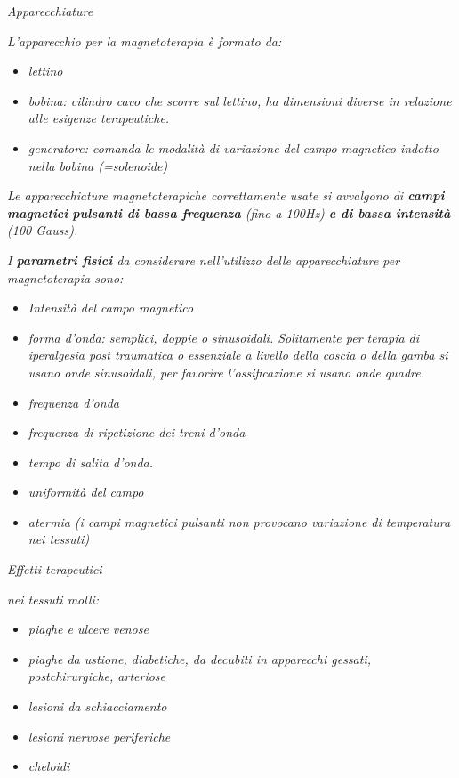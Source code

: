 \documentclass[]{article}
\begin{document}
\emph{Apparecchiature}

\emph{L'apparecchio per la magnetoterapia è formato da:}

\begin{itemize}
\item
  \emph{lettino}
\item
  \emph{bobina: cilindro cavo che scorre sul lettino, ha dimensioni
  diverse in relazione alle esigenze terapeutiche.}
\item
  \emph{generatore: comanda le modalità di variazione del campo
  magnetico indotto nella bobina (=solenoide)}
\end{itemize}

\emph{Le apparecchiature magnetoterapiche correttamente usate si
avvalgono di \textbf{campi magnetici} \textbf{pulsanti di bassa
frequenza} (fino a 100Hz) \textbf{e di bassa intensità} (100 Gauss).}

\emph{I \textbf{parametri fisici} da considerare nell'utilizzo delle
apparecchiature per magnetoterapia sono:}

\begin{itemize}
\item
  \emph{Intensità del campo magnetico}
\item
  \emph{forma d'onda: semplici, doppie o sinusoidali. Solitamente per
  terapia di iperalgesia post traumatica o essenziale a livello della
  coscia o della gamba si usano onde sinusoidali, per favorire
  l'ossificazione si usano onde quadre.}
\item
  \emph{frequenza d'onda}
\item
  \emph{frequenza di ripetizione dei treni d'onda }
\item
  \emph{tempo di salita d'onda.}
\item
  \emph{uniformità del campo}
\item
  \emph{atermia (i campi magnetici pulsanti non provocano variazione di
  temperatura nei tessuti)}
\end{itemize}

\emph{Effetti terapeutici}

\emph{\emph{nei tessuti molli:}}

\begin{itemize}
\item
  \emph{piaghe e ulcere venose}
\item
  \emph{piaghe da ustione, diabetiche, da decubiti in apparecchi
  gessati, postchirurgiche, arteriose}
\item
  \emph{lesioni da schiacciamento}
\item
  \emph{lesioni nervose periferiche}
\item
  \emph{cheloidi}
\end{itemize}
\end{document}
